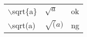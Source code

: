 \documentclass[preview]{standalone}
\newcommand{\tA}[1]{\textcolor{cA}{#1}}
\newcommand{\tD}[1]{\textcolor{cD}{#1}}
\begin{document}
\begin{table}[h]
    \centering
    \begin{tabular}{lll}
        $\backslash$sqrt\{a\} & $\sqrt{a}$ & \tA{ok} \\
        $\backslash$sqrt(a)   & $\sqrt(a)$ & \tD{ng} \\
    \end{tabular}
\end{table}
\end{document}
